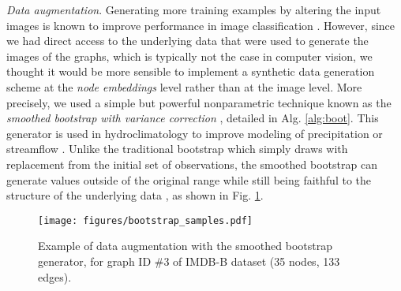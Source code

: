 \documentclass[runningheads]{llncs}
\begin{document}
\textit{Data augmentation}.
Generating more training examples by altering the input images is known to improve performance in image classification \cite{krizhevsky2012imagenet}. However, since we had direct access to the underlying data that were used to generate the images of the graphs, which is typically not the case in computer vision, we thought it would be more sensible to implement a synthetic data generation scheme at the \textit{node embeddings} level rather than at the image level. More precisely, we used a simple but powerful nonparametric technique known as the \textit{smoothed bootstrap with variance correction} \cite{silverman1986density}, detailed in Alg. \ref{alg:boot}. This generator is used in hydroclimatology to improve modeling of precipitation \cite{lall1996nonparametric} or streamflow \cite{sharma1997streamflow}. Unlike the traditional bootstrap \cite{efron1992bootstrap} which simply draws with replacement from the initial set of observations, the smoothed bootstrap can generate values outside of the original range while still being faithful to the structure of the underlying data \cite{rajagopalan1997multivariate,tixier2017construction}, as shown in Fig. \ref{fig:boot}.

\vspace{-0.25cm}

\begin{figure}[h]
  \centering
    \texttt{[image: figures/bootstrap\_samples.pdf]}
\captionsetup{justification=justified,singlelinecheck=false, size=small}
    \caption{Example of data augmentation with the smoothed bootstrap generator, for graph ID \#3 of IMDB-B dataset (35 nodes, 133 edges).}
\label{fig:boot}
\end{figure}

\vspace{-1.5cm}
\end{document}
